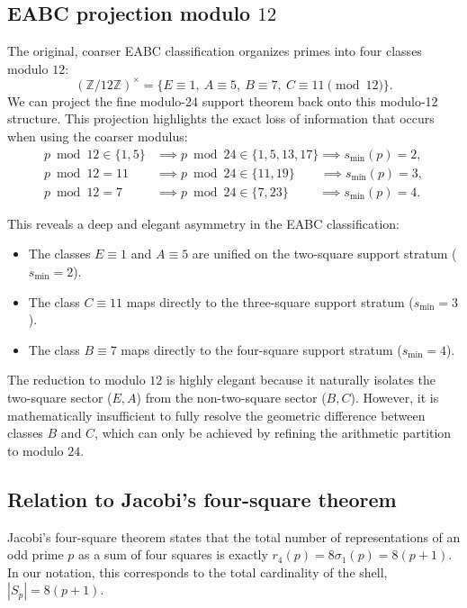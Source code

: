 \documentclass[11pt,a4paper]{article}
\theoremstyle{definition}
\begin{document}
	\subsection{EABC projection modulo $12$}
	The original, coarser EABC classification organizes primes into four classes modulo $12$:
	\begin{equation}
		(\mathbb{Z}/12\mathbb{Z})^\times = \{E \equiv 1, \ A \equiv 5, \ B \equiv 7, \ C \equiv 11 \pmod{12}\}.
	\end{equation}
	We can project the fine modulo-24 support theorem back onto this modulo-12 structure. This projection highlights the exact loss of information that occurs when using the coarser modulus:
	\begin{equation}
		\begin{aligned}
			p \bmod 12 \in \{1, 5\} & \implies p \bmod 24 \in \{1, 5, 13, 17\} \implies s_{\min}(p) = 2, \\
			p \bmod 12 = 11 & \implies p \bmod 24 \in \{11, 19\} \qquad \implies s_{\min}(p) = 3, \\
			p \bmod 12 = 7 & \implies p \bmod 24 \in \{7, 23\} \qquad\ \, \implies s_{\min}(p) = 4.
		\end{aligned}
	\end{equation}
	
	This reveals a deep and elegant asymmetry in the EABC classification:
	\begin{itemize}
		\item The classes $E \equiv 1$ and $A \equiv 5$ are unified on the two-square support stratum ($s_{\min} = 2$).
		\item The class $C \equiv 11$ maps directly to the three-square support stratum ($s_{\min} = 3$).
		\item The class $B \equiv 7$ maps directly to the four-square support stratum ($s_{\min} = 4$).
	\end{itemize}
	The reduction to modulo $12$ is highly elegant because it naturally isolates the two-square sector ($E, A$) from the non-two-square sector ($B, C$). However, it is mathematically insufficient to fully resolve the geometric difference between classes $B$ and $C$, which can only be achieved by refining the arithmetic partition to modulo $24$.
	
	\subsection{Relation to Jacobi's four-square theorem}
	Jacobi's four-square theorem states that the total number of representations of an odd prime $p$ as a sum of four squares is exactly $r_4(p) = 8\sigma_1(p) = 8(p+1)$. In our notation, this corresponds to the total cardinality of the shell, $|S_p| = 8(p+1)$. 
	
\end{document}
